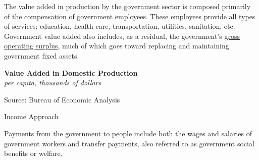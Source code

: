 \documentclass{report}
\makeatletter
\newcommand{\tbllink}[1]{\href{https://raw.githubusercontent.com/bdecon/US-chartbook/master/chartbook/data/#1}{\faTable}}
\newcommand*\short[1]{\expandafter\@gobbletwo\number\numexpr#1\relax}
\newcommand{\absnode}[3]{\node[below right, align=left] at (axis cs: #1,#2) {#3};}
\newcommand{\shdateaxisticks}{
		date coordinates in=x, axis line style={draw=none},
		xmax={2023-11-30},
		max space between ticks=40,	    
		xtick={{1990-01-01}, {1995-01-01}, {2000-01-01}, 
			{2005-01-01}, {2010-01-01}, {2015-01-01}, {2020-01-01}},
		minor xtick={},
		enlarge y limits={0.06}, enlarge x limits={0.01},
		xticklabel style={align=center, yshift=-2pt}, tick label style={inner sep=0pt},
		}
\newcommand{\bbar}[2]{extra #1 ticks = {{#2}}, extra #1 tick labels = ,
		extra #1 tick style = {grid=major, grid style={thick, black!25}},}
\newcommand{\stdline}[4]{\addplot[very thick, no markers, color=#1] 
		table [x=#2, y=#3, col sep=comma] {#4};	}
\newcommand{\rebars}{
		\fill[color=black!10] (axis cs:{2007-12-01},\pgfkeysvalueof{/pgfplots/ymin}) 
			rectangle (axis cs:{2009-07-01}, \pgfkeysvalueof{/pgfplots/ymax});
		\fill[color=black!10] (axis cs:{2001-03-01},\pgfkeysvalueof{/pgfplots/ymin}) 
			rectangle (axis cs:{2001-11-01}, \pgfkeysvalueof{/pgfplots/ymax});
		\fill[color=black!10] (axis cs:{2020-02-01},\pgfkeysvalueof{/pgfplots/ymin}) 
			rectangle (axis cs:{2020-05-01}, \pgfkeysvalueof{/pgfplots/ymax});}
\makeatother
\begin{document}
{\begin{minipage}{0.76\textwidth}
\small The value added in production by the government sector is composed primarily of the compensation of government employees. These employees provide all types of services: education, health care, transportation, utilities, sanitation, etc. Government value added also includes, as a residual, the government's \href{https://www.bea.gov/help/glossary/gross-operating-surplus}{gross operating surplus}, much of which goes toward replacing and maintaining government fixed assets. 
\end{minipage}
\vspace{1mm}

\begin{minipage}{0.375\textwidth}
\normalsize \textbf{Value Added in Domestic Production}\\
\footnotesize{\textit{per capita, thousands of dollars}}
\vspace{3.0cm}

\hspace{1mm} 

\footnotesize{Source: Bureau of Economic Analysis} \hfill \tbllink{gdpva_pc.csv}
\end{minipage} \hspace{4mm}
\begin{minipage}{0.35\textwidth}
\small 
\end{minipage}
\newpage
{}
\begin{minipage}{0.76\textwidth}    
\normalsize Income Approach
\vspace{-1mm}

\small Payments from the government to people include both the wages and salaries of government workers and transfer payments, also referred to as government social benefits or welfare.


\end{minipage}}
\end{document}
